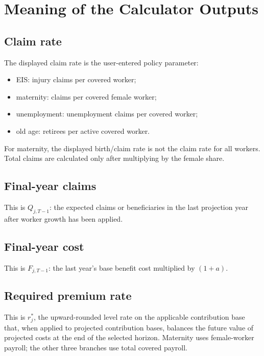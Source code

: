 \section{Meaning of the Calculator Outputs}

\subsection{Claim rate}

The displayed claim rate is the user-entered policy parameter:

\begin{itemize}
  \item EIS: injury claims per covered worker;
  \item maternity: claims per covered female worker;
  \item unemployment: unemployment claims per covered worker;
  \item old age: retirees per active covered worker.
\end{itemize}

For maternity, the displayed birth/claim rate is not the claim rate for all workers. Total claims are calculated only after multiplying by the female share.

\subsection{Final-year claims}

This is $Q_{j,T-1}$: the expected claims or beneficiaries in the last projection year after worker growth has been applied.

\subsection{Final-year cost}

This is $F_{j,T-1}$: the last year's base benefit cost multiplied by $(1+a)$.

\subsection{Required premium rate}

This is $r_j^{\ast}$, the upward-rounded level rate on the applicable contribution base that, when applied to projected contribution bases, balances the future value of projected costs at the end of the selected horizon. Maternity uses female-worker payroll; the other three branches use total covered payroll.

